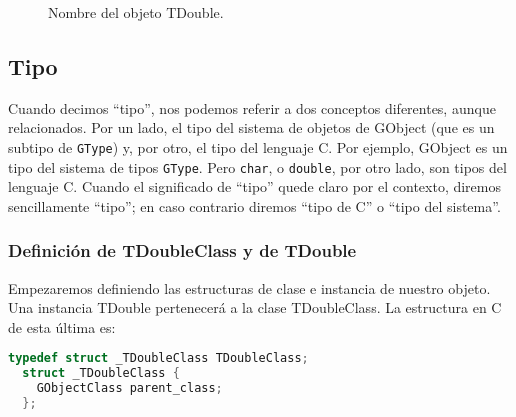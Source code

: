 \begin{figure}[ht]
  \centering
  \def\scl{1.4}
\caption{Nombre del objeto \textsf{TDouble}.}
\label{fig:nombre-objetos}
\end{figure}

\subsection{Tipo}
Cuando decimos ``tipo'', nos podemos referir a dos conceptos diferentes, aunque relacionados.
Por un lado, el tipo del sistema de objetos de \textsf{GObject} (que es un subtipo de \texttt{GType}) y,
por otro, el tipo del lenguaje C. Por ejemplo, \textsf{GObject} es un tipo del sistema de tipos \texttt{GType}.
Pero \texttt{char}, o \texttt{double}, por otro lado, son tipos del lenguaje C.
Cuando el significado de ``tipo'' quede claro por el contexto, diremos sencillamente ``tipo''; en caso contrario
diremos ``tipo de C'' o ``tipo del sistema''.

\subsubsection{Definición de \textsf{TDoubleClass} y de \textsf{TDouble}}
Empezaremos definiendo las estructuras de clase e instancia de nuestro objeto.
Una instancia \textsf{TDouble} pertenecerá a la clase \textsf{TDoubleClass}. La estructura en C de esta última es:
\begin{lstlisting}[language=C]
  typedef struct _TDoubleClass TDoubleClass;
  struct _TDoubleClass {
    GObjectClass parent_class;
  };
\end{lstlisting}

